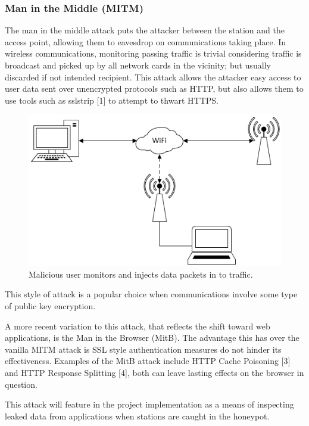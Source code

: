 \subsubsection{Man in the Middle (MITM)}
The man in the middle attack puts the attacker between the station and the access point, allowing them to eavesdrop on communications taking place. In wireless communications, monitoring passing traffic is trivial considering traffic is broadcast and picked up by all network cards in the vicinity; but usually discarded if not intended recipient. This attack allows the attacker easy access to user data sent over unencrypted protocols such as HTTP, but also allows them to use tools such as sslstrip [1] to attempt to thwart HTTPS.

\begin{figure}[h!]
\includegraphics[width=\linewidth]{research/figures/mitm.png}
\caption{Malicious user monitors and injects data packets in to traffic.}
\end{figure}

This style of attack is a popular choice when communications involve some type of public key encryption. 

A more recent variation to this attack, that reflects the shift toward web applications, is the Man in the Browser (MitB). The advantage this has over the vanilla MITM attack is SSL style authentication measures do not hinder its effectiveness. Examples of the MitB attack include HTTP Cache Poisoning [3] and HTTP Response Splitting [4], both can leave lasting effects on the browser in question.

This attack will feature in the project implementation as a means of inspecting leaked data from applications when stations are caught in the honeypot.

